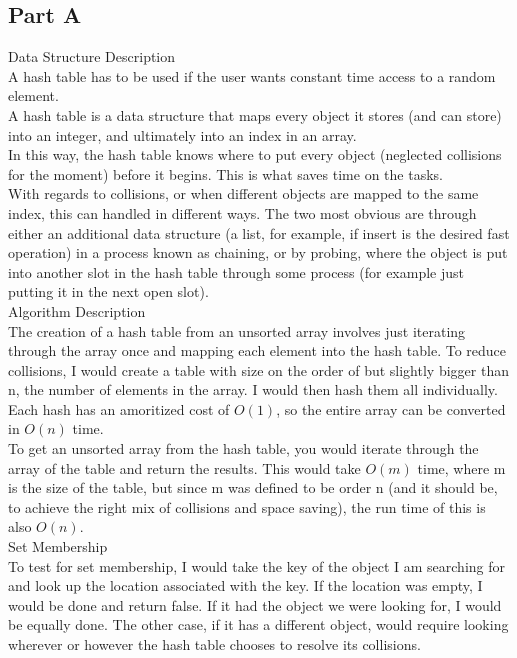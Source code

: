 \documentclass[12pt,twoside]{article}
\begin{document}
\begin{problems}

\section*{Part A}
\problem
\begin{problemparts}
\problempart Data Structure Description\\
A hash table has to be used if the user wants constant time access to a random element.\\
A hash table is a data structure that maps every object it stores (and can store) into an integer, and ultimately into an index in an array.\\

In this way, the hash table knows where to put every object (neglected collisions for the moment) before it begins.  This is what saves time on the tasks.\\

With regards to collisions, or when different objects are mapped to the same index, this can handled in different ways.  The two most obvious are through either an additional data structure (a list, for example, if insert is the desired fast operation) in a process known as chaining, or by probing, where the object is put into another slot in the hash table through some process (for example just putting it in the next open slot).\\

\problempart Algorithm Description\\
The creation of a hash table from an unsorted array involves just iterating through the array once and mapping each element into the hash table.  To reduce collisions, I would create a table with size on the order of but slightly bigger than n, the number of elements in the array.  I would then hash them all individually.  Each hash has an amoritized cost of $O(1)$, so the entire array can be converted in $O(n)$ time.\\

To get an unsorted array from the hash table, you would iterate through the array of the table and return the results.  This would take $O(m)$ time, where m is the size of the table, but since m was defined to be order n (and it should be, to achieve the right mix of collisions and space saving), the run time of this is also $O(n)$.\\

\problempart Set Membership\\
To test for set membership, I would take the key of the object I am searching for and look up the location associated with the key.  If the location was empty, I would be done and return false.  If it had the object we were looking for, I would be equally done.  The other case, if it has a different object, would require looking wherever or however the hash table chooses to resolve its collisions.  \\


\end{problemparts}
\end{problems}
\end{document}
